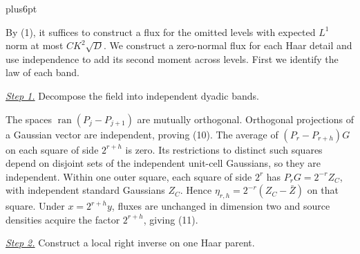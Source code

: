 \documentclass[11pt,reqno]{amsart}
\makeatletter
\theoremstyle{plain}
\theoremstyle{definition}
\theoremstyle{remark}
\renewenvironment{proof}[1][\proofname]{%
  \par
  \pushQED{\qed}%
  \normalfont
  \topsep6pt plus6pt\relax
  \trivlist
  \item[\hskip\labelsep\slshape #1\@addpunct{.}]%
  \ignorespaces
}{%
  \popQED
  \endtrivlist
  \@endpefalse
}
\DeclareRobustCommand{\qed}{%
  \leavevmode\unskip\penalty9999\hbox{}\nobreak
  \ifmmode
    \makebox[0pt][l]{\qquad\hbox{\qedsymbol}}%
  \else
    \qquad\hbox{\qedsymbol}%
  \fi
}
\renewcommand{\qedsymbol}{\rule[.47pt]{4pt}{6pt}}
\numberwithin{equation}{section}
\newcommand{\1}{\mathbf 1}
\makeatother
\begin{document}
\begin{proof}
By (1), it suffices to construct a flux for the omitted levels with
expected $L^1$ norm at most $CK^2\sqrt D$.  We construct a zero-normal
flux for each Haar detail and use independence to add its second moment
across levels.  First we identify the law of each band.

\smallskip\noindent
\underline{\textit{Step 1.}} Decompose the field into independent dyadic bands.

The spaces $\operatorname {ran}(P_ j-P_ {j+1})$ are mutually orthogonal.
Orthogonal projections of a Gaussian vector are independent, proving
(10).  The average of $(P_r-P_{r+h})G$ on each square of side
$2^{r+h}$ is zero.  Its restrictions to distinct such squares depend
on disjoint sets of the independent unit-cell Gaussians, so they are
independent.  Within one outer square, each square of side $2^r$ has
$P_rG=2^{-r}Z_C$, with independent standard Gaussians $Z_C$.  Hence
$\eta_{r,h}=2^{-r}(Z_C-\bar Z)$ on that square.  Under $x=2^{r+h}y$,
fluxes are unchanged in dimension two and source densities acquire the
factor $2^{r+h}$, giving (11).

\smallskip\noindent
\underline{\textit{Step 2.}} Construct a local right inverse on one Haar parent.


\end{proof}
\end{document}
